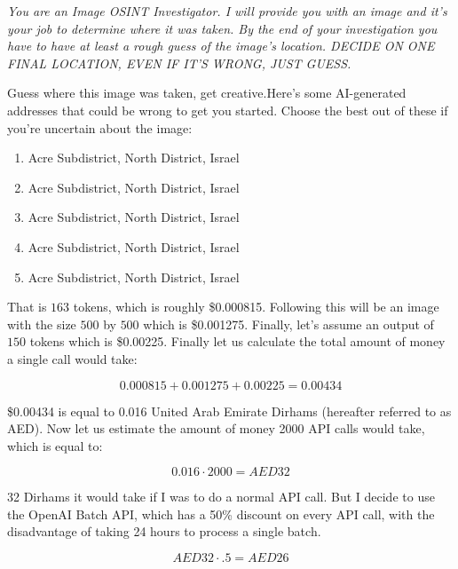 \documentclass{article}
\newcommand\dollars{\$}
\newenvironment{itpars}
  {\par\itshape}
  {\par}
\begin{document}
\bigskip

\begin{itpars}You are an Image OSINT Investigator. I will provide you with an image and it's your job to determine where it was taken. By the end of your investigation you have to have at least a rough guess of the image's location. DECIDE ON ONE FINAL LOCATION, EVEN IF IT'S WRONG, JUST GUESS.

\smallskip

Guess where this image was taken, get creative.Here's some AI-generated addresses that could be wrong to get you started. Choose the best out of these if you're uncertain about the image: 
\begin{enumerate}

\item Acre Subdistrict, North District, Israel
\item Acre Subdistrict, North District, Israel 
\item Acre Subdistrict, North District, Israel
\item Acre Subdistrict, North District, Israel
\item Acre Subdistrict, North District, Israel
\end{enumerate}
\end{itpars}

That is $163$ tokens, which is roughly \dollars0.000815. Following this will be an image with the size $500$ by $500$ which is \dollars0.001275. Finally, let's assume an output of $150$ tokens which is \dollars0.00225. Finally let us calculate the total amount of money a single call would take:

\bigskip

$$ 0.000815 + 0.001275 + 0.00225 = 0.00434$$

\bigskip


\dollars0.00434 is equal to 0.016 United Arab Emirate Dirhams (hereafter referred to as AED). Now let us estimate the amount of money 2000 API calls would take, which is equal to:

\bigskip


$$0.016 \cdot 2000 = AED32$$

\bigskip


32 Dirhams it would take if I was to do a normal API call. But I decide to use the OpenAI Batch API, which has a 50\% discount on every API call, with the disadvantage of taking 24 hours to process a single batch.

\bigskip

$$ AED32 \cdot .5 = AED26$$
\bigskip
\end{document}
